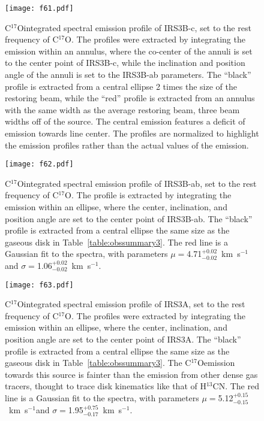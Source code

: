 \documentclass[twocolumn, 12pt]{aastex63}
\newcommand{\htcn}{H$^{13}$CN}
\newcommand{\cso}{C$^{17}$O}
\newcommand{\kms}{km~s$^{-1}$}
\begin{document}
\begin{figure}[H]
  \begin{center}
   \texttt{[image: f61.pdf]}
   \end{center}
   \caption{\cso\space integrated spectral emission profile of IRS3B-c, set to the rest frequency of \cso. The profiles were extracted by integrating the emission within an annulus, where the co-center of the annuli is set to the center point of IRS3B-c, while the inclination and position angle of the annuli is set to the IRS3B-ab parameters. The ``black'' profile is extracted from a central ellipse 2 times the size of the restoring beam, while the ``red'' profile is extracted from an annulus with the same width as the average restoring beam, three beam widths off of the source. The central emission features a deficit of emission towards line center. The profiles are normalized to highlight the emission profiles rather than the actual values of the emission.}\label{fig:irs3bspec}
\end{figure}
\begin{figure}[H]
  \begin{center}
   \texttt{[image: f62.pdf]}
   \end{center}
   \caption{\cso\space integrated spectral emission profile of IRS3B-ab, set to the rest frequency of \cso. The profile is extracted by integrating the emission within an ellipse, where the center, inclination, and position angle are set to the center point of IRS3B-ab. The ``black'' profile is extracted from a central ellipse the same size as the gaseous disk in Table~\ref{table:obssummary3}. The red line is a Gaussian fit to the spectra, with parameters $\mu=$4.71$^{+0.02}_{-0.02}$~\kms\space and $\sigma=$1.06$^{+0.02}_{-0.02}$~\kms.}\label{fig:irs3babspec}
\end{figure}
\begin{figure}[H]
  \begin{center}
   \texttt{[image: f63.pdf]}
   \end{center}
   \caption{\cso\space integrated spectral emission profile of IRS3A, set to the rest frequency of \cso. The profiles were extracted by integrating the emission within an ellipse, where the center, inclination, and position angle are set to the center point of IRS3A. The ``black'' profile is extracted from a central ellipse the same size as the gaseous disk in Table~\ref{table:obssummary3}. The \cso\space emission towards this source is fainter than the emission from other dense gas tracers, thought to trace disk kinematics like that of \htcn.  The red line is a Gaussian fit to the spectra, with parameters $\mu=$5.12$^{+0.15}_{-0.15}$~\kms\space and $\sigma=$1.95$^{+0.75}_{-0.17}$~\kms.}\label{fig:irs3aspec}
\end{figure}
\end{document}
